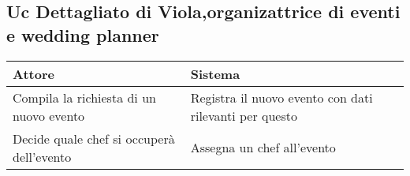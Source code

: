 \subsection{Uc Dettagliato di Viola,organizattrice di eventi e wedding planner}

\begin{tabular}{|p{3cm}|p{5cm}}
  \hline
  Attore & Sistema \\
  \hline
  Compila la richiesta di un nuovo evento & Registra il nuovo evento con dati rilevanti per questo \\
  \hline
  Decide quale chef si occuperà dell'evento & Assegna un chef all'evento \\ 
  \hline

  
\end{tabular}


